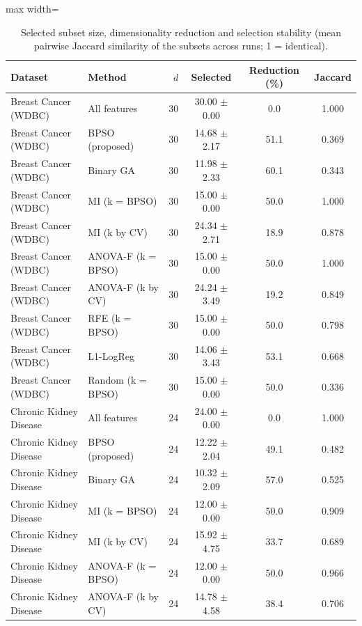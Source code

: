 \begin{table}[!t]
\centering
\caption{Selected subset size, dimensionality reduction and selection stability (mean pairwise Jaccard similarity of the subsets across runs; 1 = identical).}
\label{tab:subset_sizes}
\footnotesize
\setlength{\tabcolsep}{4pt}
\begin{adjustbox}{max width=\linewidth}
\begin{tabular}{llrccc}
\toprule
\textbf{Dataset} & \textbf{Method} & \textbf{$d$} & \textbf{Selected} & \textbf{Reduction (\%)} & \textbf{Jaccard} \\
\midrule
Breast Cancer (WDBC) & All features & 30 & 30.00 $\pm$ 0.00 & 0.0 & 1.000 \\
Breast Cancer (WDBC) & BPSO (proposed) & 30 & 14.68 $\pm$ 2.17 & 51.1 & 0.369 \\
Breast Cancer (WDBC) & Binary GA & 30 & 11.98 $\pm$ 2.33 & 60.1 & 0.343 \\
Breast Cancer (WDBC) & MI (k = BPSO) & 30 & 15.00 $\pm$ 0.00 & 50.0 & 1.000 \\
Breast Cancer (WDBC) & MI (k by CV) & 30 & 24.34 $\pm$ 2.71 & 18.9 & 0.878 \\
Breast Cancer (WDBC) & ANOVA-F (k = BPSO) & 30 & 15.00 $\pm$ 0.00 & 50.0 & 1.000 \\
Breast Cancer (WDBC) & ANOVA-F (k by CV) & 30 & 24.24 $\pm$ 3.49 & 19.2 & 0.849 \\
Breast Cancer (WDBC) & RFE (k = BPSO) & 30 & 15.00 $\pm$ 0.00 & 50.0 & 0.798 \\
Breast Cancer (WDBC) & L1-LogReg & 30 & 14.06 $\pm$ 3.43 & 53.1 & 0.668 \\
Breast Cancer (WDBC) & Random (k = BPSO) & 30 & 15.00 $\pm$ 0.00 & 50.0 & 0.336 \\
Chronic Kidney Disease & All features & 24 & 24.00 $\pm$ 0.00 & 0.0 & 1.000 \\
Chronic Kidney Disease & BPSO (proposed) & 24 & 12.22 $\pm$ 2.04 & 49.1 & 0.482 \\
Chronic Kidney Disease & Binary GA & 24 & 10.32 $\pm$ 2.09 & 57.0 & 0.525 \\
Chronic Kidney Disease & MI (k = BPSO) & 24 & 12.00 $\pm$ 0.00 & 50.0 & 0.909 \\
Chronic Kidney Disease & MI (k by CV) & 24 & 15.92 $\pm$ 4.75 & 33.7 & 0.689 \\
Chronic Kidney Disease & ANOVA-F (k = BPSO) & 24 & 12.00 $\pm$ 0.00 & 50.0 & 0.966 \\
Chronic Kidney Disease & ANOVA-F (k by CV) & 24 & 14.78 $\pm$ 4.58 & 38.4 & 0.706 \\

\end{tabular}
\end{adjustbox}
\end{table}
